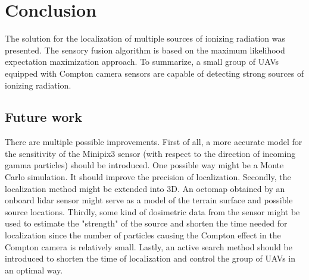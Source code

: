 
\chapter{Conclusion\label{chap:conclusion}}
The solution for the localization of multiple sources of ionizing radiation was presented.
The sensory fusion algorithm is based on the maximum likelihood expectation maximization approach.
To summarize, a small group of \ac{UAV}s equipped with Compton camera sensors are capable of detecting strong sources of ionizing radiation.

\section{Future work}
There are multiple possible improvements.
First of all, a more accurate model for the sensitivity of the Minipix3 sensor (with respect to the direction of incoming gamma particles) should be introduced.
One possible way might be a Monte Carlo simulation.
It should improve the precision of localization.
Secondly, the localization method might be extended into 3D.
An octomap obtained by an onboard lidar sensor might serve as a model of the terrain surface and possible source locations.
Thirdly, some kind of dosimetric data from the sensor might be used to estimate the "strength" of the source and shorten the time needed for localization since the number of particles causing the Compton effect in the Compton camera is relatively small.
Lastly, an active search method should be introduced to shorten the time of localization and control the group of \ac{UAV}s in an optimal way.
